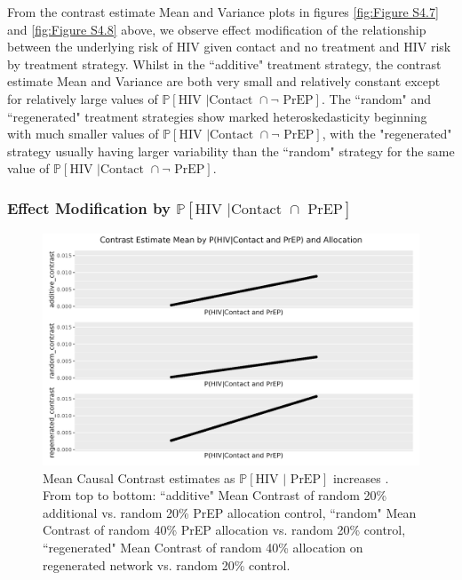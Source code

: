 \documentclass{article}
\theoremstyle{definition}
\begin{document}
From the contrast estimate Mean and Variance plots in figures \ref{fig:Figure S4.7} and \ref{fig:Figure S4.8} above, we observe effect modification of the relationship between the underlying risk of HIV given contact and no treatment and HIV risk by treatment strategy. Whilst in the ``additive" treatment strategy, the contrast estimate Mean and Variance are both very small and relatively constant except for relatively large values of $\mathbb{P}\left[\text{HIV } \vert \text {Contact } \cap \neg \text{ PrEP}\right]$. The ``random" and ``regenerated" treatment strategies show marked heteroskedasticity beginning with much smaller values of $\mathbb{P}\left[\text{HIV } \vert \text {Contact } \cap \neg \text{ PrEP}\right]$, with the "regenerated" strategy usually having larger variability than the ``random" strategy for the same value of $\mathbb{P}\left[\text{HIV } \vert \text {Contact } \cap \neg \text{ PrEP}\right]$.  
\subsubsection{Effect Modification by \texorpdfstring{$\mathbb{P}\left[\text{HIV } \vert \text {Contact } \cap \text{ PrEP}\right]$}{ℙ[HIV | PrEP]}}
\begin{figure}[H]
    \centering
    \includegraphics[width=\linewidth]{Corrected Figures/p2 Mean plots.png}
    \caption{Mean Causal Contrast estimates as $\mathbb{P}\left[\text{HIV } \vert \text{ PrEP}\right]$ increases . From top to bottom: ``additive" Mean Contrast of random 20\% additional vs. random 20\% PrEP allocation control, ``random" Mean Contrast of random 40\% PrEP allocation vs. random 20\% control, ``regenerated" Mean Contrast of random 40\% allocation on regenerated network vs. random 20\% control.}
    \label{fig:Figure S4.9}

\end{figure}
\end{document}
